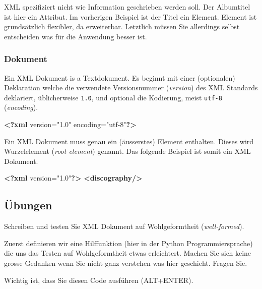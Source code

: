\documentclass[11pt]{article}
\newenvironment{Shaded}{}{}
\newcommand{\KeywordTok}[1]{\textcolor[rgb]{0.00,0.44,0.13}{\textbf{{#1}}}}
\newcommand{\NormalTok}[1]{{#1}}
\begin{document}
XML spezifiziert nicht wie Information geschrieben werden soll. Der
Albumtitel ist hier ein Attribut. Im vorherigen Beispiel ist der Titel
ein Element. Element ist grundsätzlich flexibler, da erweiterbar.
Letztlich müssen Sie allerdings selbst entscheiden was für die Anwendung
besser ist.

    \subsubsection{Dokument}\label{dokument}

Ein XML Dokument is a Textdokument. Es beginnt mit einer (optionalen)
Deklaration welche die verwendete Versionsnummer (\emph{version}) des
XML Standards deklariert, üblicherweise \texttt{1.0}, und optional die
Kodierung, meist \texttt{utf-8} (\emph{encoding}).

\begin{Shaded}
\begin{Highlighting}[]
\KeywordTok{<?xml}\NormalTok{ version="1.0" encoding="utf-8"}\KeywordTok{?>}
\end{Highlighting}
\end{Shaded}

Ein XML Dokument muss genau ein (äusserstes) Element enthalten. Dieses
wird Wurzelelement (\emph{root element}) genannt. Das folgende Beispiel
ist somit ein XML Dokument.

\begin{Shaded}
\begin{Highlighting}[]
\KeywordTok{<?xml}\NormalTok{ version="1.0"}\KeywordTok{?>}
\KeywordTok{<discography/>}
\end{Highlighting}
\end{Shaded}

    \subsection{Übungen}\label{uxfcbungen}

Schreiben und testen Sie XML Dokument auf Wohlgeformtheit
(\emph{well-formed}).

Zuerst definieren wir eine Hilffunktion (hier in der Python
Programmiersprache) die uns das Testen auf Wohlgeformtheit etwas
erleichtert. Machen Sie sich keine grosse Gedanken wenn Sie nicht ganz
verstehen was hier geschieht. Fragen Sie.

Wichtig ist, dass Sie diesen Code ausführen (ALT+ENTER).
\end{document}
